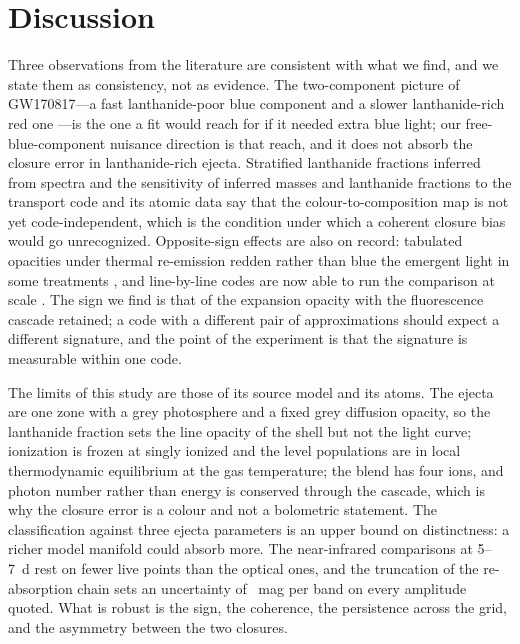 \documentclass[11pt]{article}
\begin{document}
\section{Discussion}\label{sec:discussion}

Three observations from the literature are consistent with what we find, and we state them as consistency, not as evidence. The two-component picture of GW170817---a fast lanthanide-poor blue component and a slower lanthanide-rich red one \cite{kasen2017,tanvir2017,chornock2017}---is the one a fit would reach for if it needed extra blue light; our free-blue-component nuisance direction is that reach, and it does not absorb the closure error in lanthanide-rich ejecta. Stratified lanthanide fractions inferred from spectra \cite{gillanders2022,watson2019} and the sensitivity of inferred masses and lanthanide fractions to the transport code and its atomic data \cite{brethauer2024,vieira2023,bulla2019,wollaeger2018,kawaguchi2018} say that the colour-to-composition map is not yet code-independent, which is the condition under which a coherent closure bias would go unrecognized. Opposite-sign effects are also on record: tabulated opacities under thermal re-emission redden rather than blue the emergent light in some treatments \cite{fontes2020,fontes2026}, and line-by-line codes are now able to run the comparison at scale \cite{shingles2023,collins2023,collins2026,morag2026,domoto2022,li2019}. The sign we find is that of the expansion opacity with the fluorescence cascade retained; a code with a different pair of approximations should expect a different signature, and the point of the experiment is that the signature is measurable within one code.

The limits of this study are those of its source model and its atoms. The ejecta are one zone with a grey photosphere and a fixed grey diffusion opacity, so the lanthanide fraction sets the line opacity of the shell but not the light curve; ionization is frozen at singly ionized and the level populations are in local thermodynamic equilibrium at the gas temperature; the blend has four ions, and photon number rather than energy is conserved through the cascade, which is why the closure error is a colour and not a bolometric statement. The classification against three ejecta parameters is an upper bound on distinctness: a richer model manifold could absorb more. The near-infrared comparisons at 5--7~d rest on fewer live points than the optical ones, and the truncation of the re-absorption chain sets an uncertainty of \ChainDmChange\ mag per band on every amplitude quoted. What is robust is the sign, the coherence, the persistence across the grid, and the asymmetry between the two closures.
\end{document}
